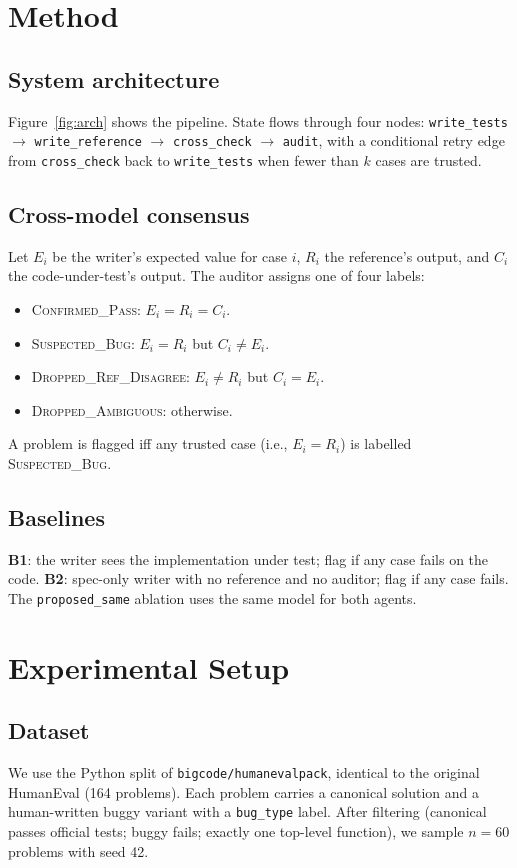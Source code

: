 \documentclass[conference]{IEEEtran}
\begin{document}
\section{Method}
\subsection{System architecture}
Figure~\ref{fig:arch} shows the pipeline. State flows through four nodes:
\texttt{write\_tests} $\to$ \texttt{write\_reference} $\to$ \texttt{cross\_check}
$\to$ \texttt{audit}, with a conditional retry edge from \texttt{cross\_check}
back to \texttt{write\_tests} when fewer than $k$ cases are trusted.

\subsection{Cross-model consensus}
Let $E_i$ be the writer's expected value for case $i$, $R_i$ the reference's
output, and $C_i$ the code-under-test's output. The auditor assigns one of
four labels:
\begin{itemize}
\item \textsc{Confirmed\_Pass}: $E_i = R_i = C_i$.
\item \textsc{Suspected\_Bug}: $E_i = R_i$ but $C_i \neq E_i$.
\item \textsc{Dropped\_Ref\_Disagree}: $E_i \neq R_i$ but $C_i = E_i$.
\item \textsc{Dropped\_Ambiguous}: otherwise.
\end{itemize}
A problem is flagged iff any trusted case (i.e., $E_i = R_i$) is labelled
\textsc{Suspected\_Bug}.

\subsection{Baselines}
\textbf{B1}: the writer sees the implementation under test; flag if any case
fails on the code. \textbf{B2}: spec-only writer with no reference and no
auditor; flag if any case fails. The \texttt{proposed\_same} ablation uses
the same model for both agents.

\section{Experimental Setup}
\subsection{Dataset}
We use the Python split of \texttt{bigcode/humanevalpack}, identical to the
original HumanEval (164 problems). Each problem carries a canonical solution
and a human-written buggy variant with a \texttt{bug\_type} label. After
filtering (canonical passes official tests; buggy fails; exactly one
top-level function), we sample $n=60$ problems with seed 42.
\end{document}

